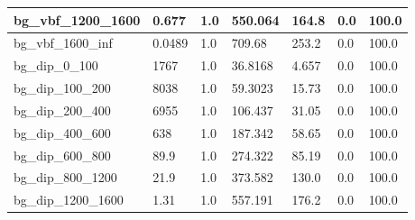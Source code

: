 \documentclass[a4paper, 10pt]{article}
\begin{document}
\begin{table}[H]
\begin{center}
\begin{tabular}{|m{23.0mm}|m{23.0mm}|m{18.0mm}|m{19.0mm}|m{19.0mm}|m{19.0mm}|m{19.0mm}|}
      \hline
      {\cellcolor{white}         bg\_vbf\_1200\_1600}& {\cellcolor{white}         0.677}& {\cellcolor{white}         1.0}& {\cellcolor{white}         550.064}& {\cellcolor{white}         164.8}& {\cellcolor{red}         0.0}& {\cellcolor{red}         100.0}\\
      \hline
      {\cellcolor{white}         bg\_vbf\_1600\_inf}& {\cellcolor{white}         0.0489}& {\cellcolor{white}         1.0}& {\cellcolor{white}         709.68}& {\cellcolor{white}         253.2}& {\cellcolor{red}         0.0}& {\cellcolor{red}         100.0}\\
      \hline
      {\cellcolor{white}         bg\_dip\_0\_100}& {\cellcolor{white}         1767}& {\cellcolor{white}         1.0}& {\cellcolor{white}         36.8168}& {\cellcolor{white}         4.657}& {\cellcolor{red}         0.0}& {\cellcolor{red}         100.0}\\
      \hline
      {\cellcolor{white}         bg\_dip\_100\_200}& {\cellcolor{white}         8038}& {\cellcolor{white}         1.0}& {\cellcolor{white}         59.3023}& {\cellcolor{white}         15.73}& {\cellcolor{red}         0.0}& {\cellcolor{red}         100.0}\\
      \hline
      {\cellcolor{white}         bg\_dip\_200\_400}& {\cellcolor{white}         6955}& {\cellcolor{white}         1.0}& {\cellcolor{white}         106.437}& {\cellcolor{white}         31.05}& {\cellcolor{red}         0.0}& {\cellcolor{red}         100.0}\\
      \hline
      {\cellcolor{white}         bg\_dip\_400\_600}& {\cellcolor{white}         638}& {\cellcolor{white}         1.0}& {\cellcolor{white}         187.342}& {\cellcolor{white}         58.65}& {\cellcolor{red}         0.0}& {\cellcolor{red}         100.0}\\
      \hline
      {\cellcolor{white}         bg\_dip\_600\_800}& {\cellcolor{white}         89.9}& {\cellcolor{white}         1.0}& {\cellcolor{white}         274.322}& {\cellcolor{white}         85.19}& {\cellcolor{red}         0.0}& {\cellcolor{red}         100.0}\\
      \hline
      {\cellcolor{white}         bg\_dip\_800\_1200}& {\cellcolor{white}         21.9}& {\cellcolor{white}         1.0}& {\cellcolor{white}         373.582}& {\cellcolor{white}         130.0}& {\cellcolor{red}         0.0}& {\cellcolor{red}         100.0}\\
      \hline
      {\cellcolor{white}         bg\_dip\_1200\_1600}& {\cellcolor{white}         1.31}& {\cellcolor{white}         1.0}& {\cellcolor{white}         557.191}& {\cellcolor{white}         176.2}& {\cellcolor{red}         0.0}& {\cellcolor{red}         100.0}\\

\end{tabular}
\end{center}
\end{table}
\end{document}
